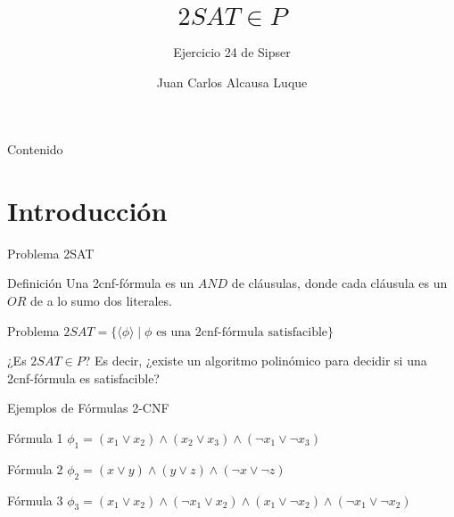 \documentclass{beamer}
\title{$2SAT \in P$}
\subtitle{Ejercicio 24 de Sipser}
\author{Juan Carlos Alcausa Luque}
\institute{Universidad de Málaga}
\date{}
\begin{document}
\begin{frame}
\titlepage
\end{frame}

\begin{frame}{Contenido}
\tableofcontents
\end{frame}

\section{Introducción}
\begin{frame}{Problema 2SAT}
\begin{block}{Definición}
Una \alert{2cnf-fórmula} es un $AND$ de cláusulas, donde cada cláusula es un $OR$ de \alert{a lo sumo dos literales}.
\end{block}

\begin{block}{Problema}
$2SAT = \{\langle \phi \rangle \mid \phi \text{ es una 2cnf-fórmula satisfacible} \}$

\vspace{0.3cm}
¿Es $2SAT \in P$? Es decir, ¿existe un algoritmo polinómico para decidir si una 2cnf-fórmula es satisfacible?
\end{block}
\end{frame}

\begin{frame}{Ejemplos de Fórmulas 2-CNF}
	\begin{block}{Fórmula 1}
	$\phi_1 = (x_1 \lor x_2) \land (x_2 \lor x_3) \land (\neg x_1 \lor \neg x_3)$
	\end{block}
	
	\begin{block}{Fórmula 2}
	$\phi_2 = (x \lor y) \land (y \lor z) \land (\neg x \lor \neg z)$
	\end{block}
	
	\begin{block}{Fórmula 3}
	$\phi_3 = (x_1 \lor x_2) \land (\neg x_1 \lor x_2) \land (x_1 \lor \neg x_2) \land (\neg x_1 \lor \neg x_2)$
	\end{block}
\end{frame}
\end{document}
